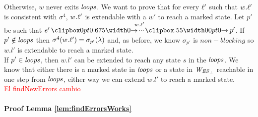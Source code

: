 Otherwise, $w$ never exits $\mathit{loops}$. We want to prove that for every $\ell'$ such that $w.\ell'$ is consistent with $\sigma^4$, $w.\ell'$ is extendable with a $w'$ to reach a marked state. Let $p'$ be such that $e' \runw{w.\l'}{} p'$. If $p' \notin \mathit{loops}$ then $\sigma^4(w.\ell') = \sigma_{p'}(\lambda)$ and, as before, we know $\sigma_{p'}$ is $non-blocking$ so $w.l'$ is extendable to reach a marked state.\\
If $p' \in \mathit{loops}$, then  $w.l'$ can be extended to reach any state $s$ in the $\mathit{loops}$. We know that either there is a marked state in $\mathit{loops}$ or a state in $\mathit{W_{\mathit{\mathit{ES}_{\bot}}}}$ reachable in one step from $\mathit{loops}$, either way we can extend $w.l'$ to reach a marked state.\\



\textcolor{red}{El findNewErrors cambio}
\paragraph*{Proof Lemma \ref{lem:findErrorsWorks}}
 



